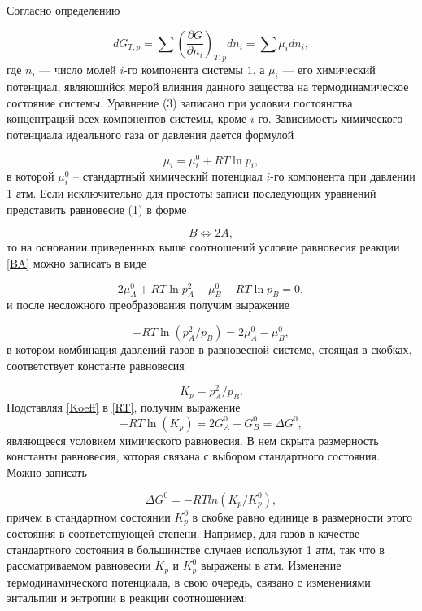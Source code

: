 \documentclass[a4paper,12pt]{article} %
\begin{document}
Согласно определению

\begin{equation}
 dG_{T,p}  = \sum {(\frac{\partial G}{\partial n_i})_{T,p} dn_i = \sum {\mu_i dn_i}  },
\end{equation}	
где \(n_i\) — число молей \(i\)-го компонента системы \(1\), а \(\mu_i\) — его химический потенциал, являющийся мерой влияния данного вещества на термодинамическое состояние системы. Уравнение (3) записано при условии постоянства концентраций всех компонентов системы, кроме \(i\)-го. Зависимость химического потенциала идеального газа от давления дается формулой

\begin{equation}
 \mu_i = \mu_i^0 + RT \ln{p_i},
\end{equation}
в которой \( \mu_i^0 \) -- стандартный химический потенциал \(i\)-го компонента при давлении 1 атм.
Если исключительно для простоты записи последующих уравнений представить равновесие (1) в форме

\begin{equation}\label{BA}
 B \Leftrightarrow 2A,
\end{equation}
то на основании приведенных выше соотношений условие равновесия реакции \eqref{BA} можно записать в виде

\begin{equation}
 2 \mu_A^0 + RT \ln{p_A^2} - \mu_B^0 - RT \ln{p_B} = 0,
\end{equation}
и после несложного преобразования получим выражение

\begin{equation} \label{RT}
 -RT \ln(p_A^2 / p_B) = 2 \mu_A^0 - \mu_B^0,
\end{equation}
в котором комбинация давлений газов в равновесной системе, стоящая в скобках, соответствует константе равновесия

\begin{equation} \label{Koeff}
 K_p = p_A^2 / p_B.
\end{equation}
Подставляя \eqref{Koeff} в \eqref{RT}, получим выражение
\begin{equation}
 -RT \ln(K_p) =  2 G_A^0 - G_B^0 = \Delta G^0,
\end{equation}
являющееся условием химического равновесия. В нем скрыта размерность константы равновесия, которая связана с выбором стандартного состояния. Можно записать

\begin{equation}
 \Delta G^0 = -RT ln(K_p / K_p^0),
\end{equation}
причем в стандартном состоянии \(K_p^0\) в скобке равно единице в размерности этого состояния в соответствующей степени. Например, для газов в качестве стандартного состояния в большинстве случаев используют 1 атм, так что в рассматриваемом равновесии \(K_p\) и \(K_p^0\) выражены в атм.
Изменение термодинамического потенциала, в свою очередь, связано с изменениями энтальпии и энтропии в реакции соотношением:
\end{document}
